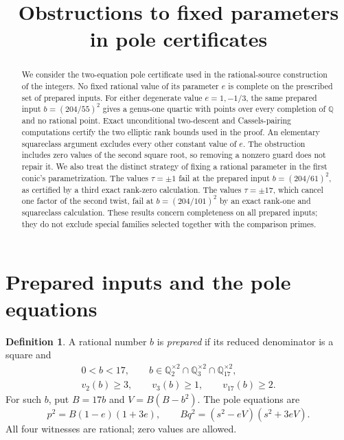 \documentclass[11pt,a4paper]{article}
\title{Obstructions to fixed parameters in pole certificates}
\author{}\date{}
\theoremstyle{definition}\newtheorem{definition}[theorem]{Definition}
\newcommand{\Q}{\mathbb Q}\newcommand{\Z}{\mathbb Z}
\begin{document}
\maketitle
\begin{abstract}
We consider the two-equation pole certificate used in the rational-source
construction of the integers.  No fixed rational value of its parameter
$e$ is complete on the prescribed set of prepared inputs.  For either
degenerate value $e=1,-1/3$, the same prepared input
$b=(204/55)^2$ gives a genus-one quartic with points over every completion
of $\Q$ and no rational point.  Exact unconditional two-descent and
Cassels-pairing computations certify the two elliptic rank bounds used
in the proof.  An elementary squareclass argument excludes every other
constant value of $e$.  The obstruction includes zero values of the
second square root, so removing a nonzero guard does not repair it.
We also treat the distinct strategy of fixing a rational parameter
in the first conic's parametrization. The values $\tau=\pm1$
fail at the prepared input $b=(204/61)^2$, as certified
by a third exact rank-zero calculation. The values $\tau=\pm17$,
which cancel one factor of the second twist, fail at
$b=(204/101)^2$ by an exact rank-one and squareclass calculation.
These results concern
completeness on all prepared inputs; they do not exclude special
families selected together with the comparison primes.
\end{abstract}

\section{Prepared inputs and the pole equations}

\begin{definition}
A rational number $b$ is \emph{prepared} if its reduced denominator is
a square and
\[
 \begin{gathered}
 0<b<17,\qquad b\in\Q_2^{\times2}\cap\Q_3^{\times2}
                      \cap\Q_{17}^{\times2},\\
 v_2(b)\ge3,\qquad v_3(b)\ge1,\qquad v_{17}(b)\ge2.
 \end{gathered}
\]
For such $b$, put $B=17b$ and $V=B(B-b^2)$.  The pole equations are
\begin{equation}\label{eq:pole}
 p^2=B(1-e)(1+3e),\qquad
 Bq^2=(s^2-eV)(s^2+3eV).
\end{equation}
All four witnesses are rational; zero values are allowed.
\end{definition}
\end{document}
